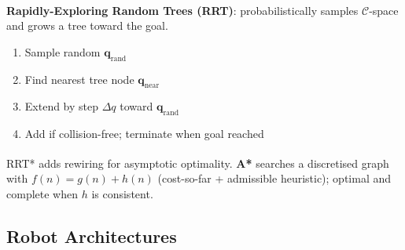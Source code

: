 \begin{tcbitemize}[ skin=sectionraster ]
    \tcbitem[title={Sampling-Based Planning: RRT and A*}, raster multicolumn=3]
    \textbf{Rapidly-Exploring Random Trees (RRT)}\textsuperscript{\cite[][pp.~293--300]{karrasRRTPathPlanning2020}}: probabilistically samples $\mathcal{C}$-space and grows a tree toward the goal.
    \begin{enumerate}
        \item Sample random $\mathbf{q}_{\text{rand}}$
        \item Find nearest tree node $\mathbf{q}_{\text{near}}$
        \item Extend by step $\Delta q$ toward $\mathbf{q}_{\text{rand}}$
        \item Add if collision-free; terminate when goal reached
    \end{enumerate}
    RRT* adds rewiring for asymptotic optimality.
    \textbf{A*}\textsuperscript{\cite[][pp.~100--107]{astarPathPlanning1968}} searches a discretised graph with $f(n) = g(n) + h(n)$ (cost-so-far + admissible heuristic); optimal and complete when $h$ is consistent.
\end{tcbitemize}

\subsection{Robot Architectures}


